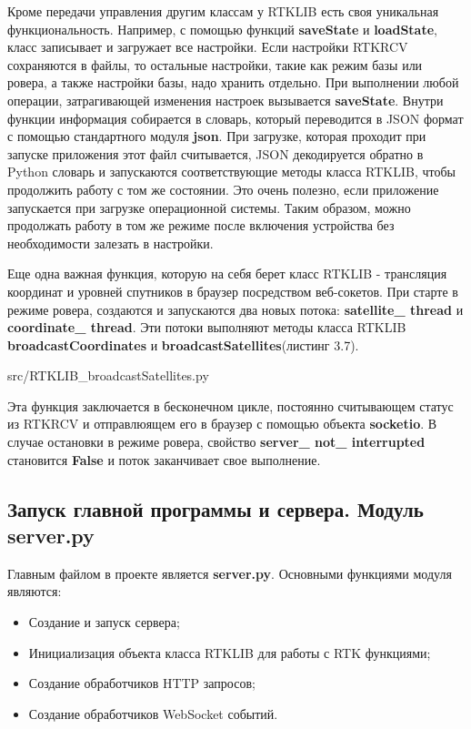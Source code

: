 Кроме передачи управления другим классам у RTKLIB есть своя уникальная функциональность. Например, с помощью функций \textbf{saveState} и \textbf{loadState}, класс записывает и загружает все настройки. Если настройки RTKRCV сохраняются в файлы, то остальные настройки, такие как режим базы или ровера, а также настройки базы, надо хранить отдельно. При выполнении любой операции, затрагивающей изменения настроек вызывается \textbf{saveState}. Внутри функции информация собирается в словарь, который переводится в JSON формат с помощью стандартного модуля \textbf{json}. При загрузке, которая проходит при запуске приложения этот файл считывается, JSON декодируется обратно в Python словарь и запускаются соответствующие методы класса RTKLIB, чтобы продолжить работу с том же состоянии. Это очень полезно, если приложение запускается при загрузке операционной системы. Таким образом, можно продолжать работу в том же режиме после включения устройства без необходимости залезать в настройки.

Еще одна важная функция, которую на себя берет класс RTKLIB - трансляция координат и уровней спутников в браузер посредством веб-сокетов. При старте в режиме ровера, создаются и запускаются два новых потока: \textbf{satellite\_ thread} и \textbf{coordinate\_ thread}. Эти потоки выполняют методы класса RTKLIB \textbf{broadcastCoordinates} и \textbf{broadcastSatellites}(листинг 3.7).


{src/RTKLIB_broadcastSatellites.py}

Эта функция заключается в бесконечном цикле, постоянно считывающем статус из RTKRCV и отправлюящем его в браузер с помощью объекта \textbf{socketio}. В случае остановки в режиме ровера, свойство \textbf{server\_ not\_ interrupted} становится \textbf{False} и поток заканчивает свое выполнение.

\subsection{Запуск главной программы и сервера. Модуль server.py} \label{subsect3_1_5}

Главным файлом в проекте является \textbf{server.py}. Основными функциями модуля являются:

\begin{itemize}
  \item Создание и запуск сервера;
  \item Инициализация объекта класса RTKLIB для работы с RTK функциями;
  \item Создание обработчиков HTTP запросов;
  \item Создание обработчиков WebSocket событий.
\end{itemize}

